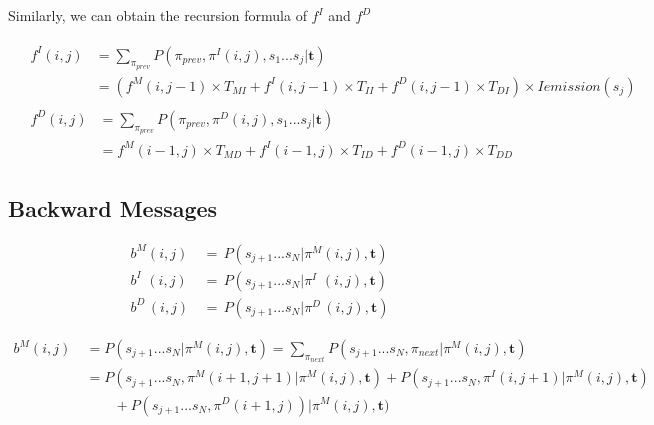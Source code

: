 \documentclass[10pt]{article}
\begin{document}
    Similarly, we can obtain the recursion formula of $f^{I}$ and $f^{D}$

    \begin{align}
      &\begin{aligned}
        f^{I}(i, j) &= \sum\nolimits_{\pi_{prev}} P(\pi_{prev}, \pi^I(i, j), s_1...s_j | \mathbf{t}) \\
                    &= (f^{M}(i, j-1) \times T_{MI}  + f^{I}(i, j-1) \times T_{II} + f^{D}(i, j-1) \times T_{DI}) \times Iemission(s_j)
      \end{aligned} \\
      &\begin{aligned}
        f^{D}(i, j) &= \sum\nolimits_{\pi_{prev}} P(\pi_{prev}, \pi^D(i, j), s_1...s_j | \mathbf{t}) \\
                    &= f^{M}(i-1, j) \times T_{MD}  + f^{I}(i-1, j) \times T_{ID} + f^{D}(i-1, j) \times T_{DD}
      \end{aligned}
    \end{align}

  \subsection{Backward Messages}
    \begin{equation}
    \begin{aligned}
      b^{M}(i, j) \,&=\, P(s_{j+1}...s_N | \pi^M(i, j), \mathbf{t}) \\
      b^{I}\,\,(i, j) \,&=\, P(s_{j+1}...s_N | \pi^I\,\,(i, j), \mathbf{t}) \\
      b^{D}\,(i, j) \,&=\, P(s_{j+1}...s_N | \pi^D\,(i, j), \mathbf{t})
    \end{aligned}
    \end{equation}

    \begin{equation} \label{eq121}
    \begin{aligned}
      b^M(i, j) \
        &= P(s_{j+1}...s_N | \pi^{M}(i, j), \mathbf{t}) = \sum\nolimits_{\pi_{next}} P(s_{j+1}...s_N, \pi_{next} | \pi^{M}(i, j), \mathbf{t}) \\
        &= P(s_{j+1}...s_N, \pi^M(i+1, j+1) | \pi^M(i, j), \mathbf{t}) + P(s_{j+1}...s_N, \pi^I(i, j+1) | \pi^M(i, j), \mathbf{t})  \\
        &\qquad + P(s_{j+1}...s_N, \pi^D(i+1, j)) | \pi^M(i, j), \mathbf{t})
    \end{aligned}
    \end{equation}
\end{document}
